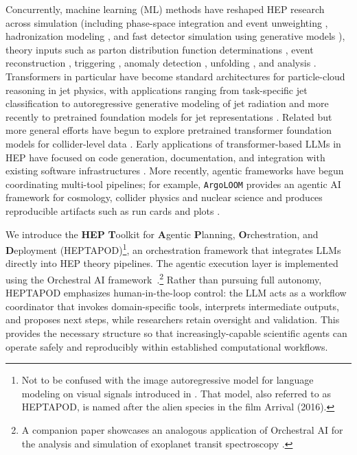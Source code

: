 \documentclass[11pt,oneside]{article}
\numberwithin{equation}{section}
\newcommand{\pkgname}{HEPTAPOD\xspace}
\begin{document}
Concurrently, machine learning (ML) methods have reshaped HEP research across simulation \cite{Butter:2022rso} (including phase-space integration and event unweighting \cite{Bothmann:2020ywa,Gao:2020zvv}, hadronization modeling \cite{Ilten:2022jfm,Bierlich:2023zzd,Bierlich:2024xzg,Assi:2025avy,Butter:2025wxn}, and fast detector simulation using generative models \cite{Buhmann:2023bwk}), theory inputs such as parton distribution function determinations
\cite{NNPDF:2021njg,NNPDF:2021uiq}, event reconstruction \cite{ExaTrkX:2020nyf}, triggering \cite{Iiyama:2020wap,Duarte:2019fta}, anomaly detection \cite{Aarrestad:2021oeb,Kasieczka:2021xcg}, unfolding \cite{Andreassen:2019cjw,Bellagente:2020piv}, and analysis \cite{Albertsson:2018maf,Guest:2018yhq}. 
Transformers in particular have become standard architectures for particle-cloud reasoning in jet physics, with applications ranging from task-specific jet classification \cite{Qu:2019gqs,Qu:2022mxj} to autoregressive generative modeling of jet radiation \cite{Butter:2023fov} and more recently to pretrained foundation models for jet representations \cite{Birk:2024knn,Golling:2024abg}.
Related but more general efforts have begun to explore pretrained transformer foundation models for collider-level data \cite{Bardhan:2025icr}.
Early applications of transformer-based LLMs in HEP have focused on code generation, documentation, and integration with existing software infrastructures \cite{Zhang:2024kws,Atif:2025mkh}. More recently, agentic frameworks have begun coordinating multi-tool pipelines; for example, \texttt{ArgoLOOM} provides an agentic AI framework for cosmology, collider physics and nuclear science and produces reproducible artifacts such as run cards and plots \cite{Bakshi:2025fgx}.

We introduce the \textbf{HEP} \textbf{T}oolkit for \textbf{A}gentic \textbf{P}lanning, \textbf{O}rchestration, and \textbf{D}eployment (\pkgname)\footnote{Not to be confused with the image autoregressive model for language modeling on visual signals introduced in \cite{zhu2025heptapodlanguagemodelingvisual}. That model, also referred to as HEPTAPOD, is named after the alien species in the film Arrival (2016).}, an orchestration framework that integrates LLMs directly into HEP theory pipelines. The agentic execution layer is implemented using the {\sc Orchestral AI} framework~\cite{orchestral-ai}.\footnote{A companion paper showcases an analogous application of {\sc Orchestral AI} for the analysis and simulation of exoplanet transit spectroscopy \cite{ASTER}.} 
Rather than pursuing full autonomy, \pkgname emphasizes human-in-the-loop control: the LLM acts as a workflow coordinator that invokes domain-specific tools, interprets intermediate outputs, and proposes next steps, while researchers retain oversight and validation. 
This provides the necessary structure so that increasingly-capable scientific agents can operate safely and reproducibly within established computational workflows. 
\end{document}
